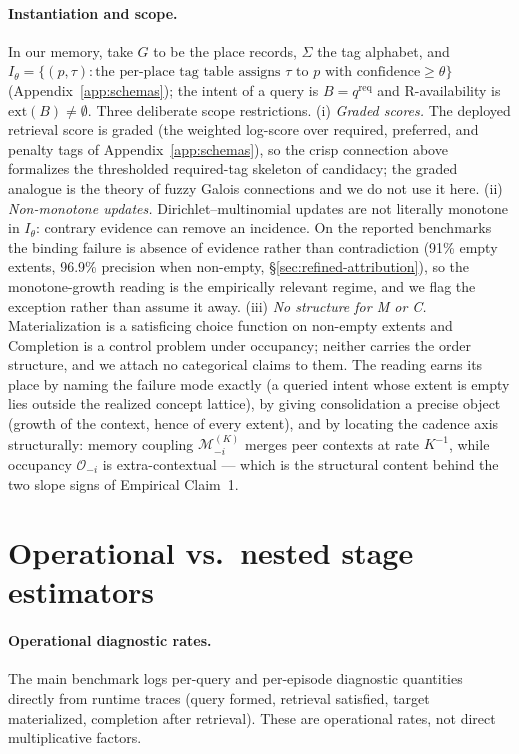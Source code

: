 \documentclass{article}
\begin{document}
\paragraph{Instantiation and scope.}
In our memory, take $G$ to be the place records, $\Sigma$ the tag alphabet, and $I_\theta = \{(p,\tau) : \text{the per-place tag table assigns } \tau \text{ to } p \text{ with confidence} \ge \theta\}$ (Appendix~\ref{app:schemas}); the intent of a query is $B = q^{\mathrm{req}}$ and R-availability is $\mathrm{ext}(B) \ne \emptyset$. Three deliberate scope restrictions. (i) \emph{Graded scores.} The deployed retrieval score is graded (the weighted log-score over required, preferred, and penalty tags of Appendix~\ref{app:schemas}), so the crisp connection above formalizes the thresholded required-tag skeleton of candidacy; the graded analogue is the theory of fuzzy Galois connections \citep{belohlavek1999fuzzy} and we do not use it here. (ii) \emph{Non-monotone updates.} Dirichlet--multinomial updates are not literally monotone in $I_\theta$: contrary evidence can remove an incidence. On the reported benchmarks the binding failure is absence of evidence rather than contradiction (91\% empty extents, 96.9\% precision when non-empty, \S\ref{sec:refined-attribution}), so the monotone-growth reading is the empirically relevant regime, and we flag the exception rather than assume it away. (iii) \emph{No structure for M or C.} Materialization is a satisficing choice function on non-empty extents and Completion is a control problem under occupancy; neither carries the order structure, and we attach no categorical claims to them. The reading earns its place by naming the failure mode exactly (a queried intent whose extent is empty lies outside the realized concept lattice), by giving consolidation a precise object (growth of the context, hence of every extent), and by locating the cadence axis structurally: memory coupling $\mathcal{M}^{(K)}_{-i}$ merges peer contexts at rate $K^{-1}$, while occupancy $\mathcal{O}_{-i}$ is extra-contextual --- which is the structural content behind the two slope signs of Empirical Claim~1.

\section{Operational vs.\ nested stage estimators}
\label{app:estimators}

\paragraph{Operational diagnostic rates.}
The main benchmark logs per-query and per-episode diagnostic quantities directly from runtime traces (query formed, retrieval satisfied, target materialized, completion after retrieval). These are operational rates, not direct multiplicative factors.
\end{document}
